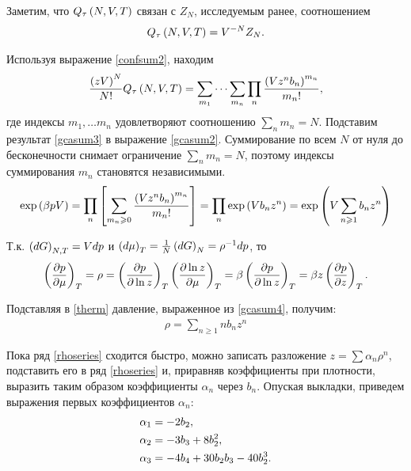 Заметим, что $Q_\tau \left( N, V, T \right)$ связан с $Z_N$, исследуемым ранее, соотношением
\vverh
\begin{gather}
	Q_\tau \left( N, V, T \right) = V^{-N} Z_N. \notag
\end{gather}

Используя выражение \eqref{confsum2}, находим
\vverh
\begin{gather}
	\frac{ \left( z V \right)^N}{N!} Q_\tau \left( N, V, T \right) = \sum_{m_1} \cdots \sum_{m_n} \prod_n \frac{\left( V z^n b_n \right)^{m_n}}{m_n!}, \label{gcasum3}
\end{gather}
где индексы $m_1, \dots m_n$ удовлетворяют соотношению $\sum_n m_n = N$. Подставим результат \eqref{gcasum3} в выражение \eqref{gcasum2}. Суммирование по всем $N$ от нуля до бесконечности снимает ограничение $\sum_n m_n = N$, поэтому индексы суммирования $m_n$ становятся независимыми.
\vverh
\begin{gather}
	\exp \left( \beta p V \right) = \prod_n \left[ \sum_{m_n \geqslant 0} \frac{ \left( V z^n b_n \right)^{m_n}}{m_n!} \right] = \prod_n \exp \left( V b_n z^n \right) = \exp \left( V \sum_{n \geqslant 1} b_n z^n \right) \label{gcasum4}
\end{gather}

Т.к. $\left( dG \right)_{N, T} = V dp$ и $\left( d \mu \right)_T = \frac{1}{N} \left( d G \right)_N = \rho^{-1} d p$, то
\vverh
\begin{gather}
	\left( \frac{\partial p}{\partial \mu} \right)_T = \rho = \left( \frac{\partial p}{\partial \ln z} \right)_T \left( \frac{\partial \ln z}{\partial \mu} \right)_T = \beta \left( \frac{\partial p}{\partial \ln z} \right)_T = \beta z \left( \frac{\partial p}{\partial z} \right)_T. \label{therm}
\end{gather}

Подставляя в \eqref{therm} давление, выраженное из \eqref{gcasum4}, получим:
\vverh
\begin{gather}
	\rho = \sum_{n \geqslant 1} n b_n z^n \label{rhoseries}
\end{gather}

Пока ряд \eqref{rhoseries} сходится быстро, можно записать разложение $z = \sum \alpha_n \rho^n$, подставить его в ряд \eqref{rhoseries} и, приравняв коэффициенты при плотности, выразить таким образом коэффициенты $\alpha_n$ через $b_n$. Опуская выкладки, приведем выражения первых коэффициентов $\alpha_n$:
\vverh
\begin{gather}
	\begin{aligned}
		\alpha_1 &= - 2 b_2 , \\
		\alpha_2 &= - 3 b_3 + 8 b_2^2, \\
		\alpha_3 &= - 4 b_4 + 30 b_2 b_3 - 40 b_2^3.
	\end{aligned} \notag
\end{gather}

